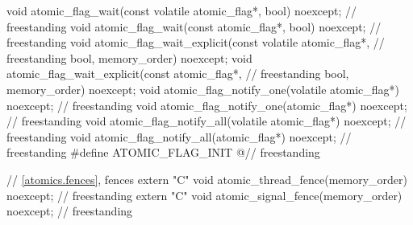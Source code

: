 \begin{codeblock}
{  void atomic_flag_wait(const volatile atomic_flag*, bool) noexcept;                // freestanding
  void atomic_flag_wait(const atomic_flag*, bool) noexcept;                         // freestanding
  void atomic_flag_wait_explicit(const volatile atomic_flag*,                       // freestanding
                                 bool, memory_order) noexcept;
  void atomic_flag_wait_explicit(const atomic_flag*,                                // freestanding
                                 bool, memory_order) noexcept;
  void atomic_flag_notify_one(volatile atomic_flag*) noexcept;                      // freestanding
  void atomic_flag_notify_one(atomic_flag*) noexcept;                               // freestanding
  void atomic_flag_notify_all(volatile atomic_flag*) noexcept;                      // freestanding
  void atomic_flag_notify_all(atomic_flag*) noexcept;                               // freestanding
  #define ATOMIC_FLAG_INIT @\seebelownc@                                                // freestanding

  // \ref{atomics.fences}, fences
  extern "C" void atomic_thread_fence(memory_order) noexcept;                       // freestanding
  extern "C" void atomic_signal_fence(memory_order) noexcept;                       // freestanding
}
\end{codeblock}

